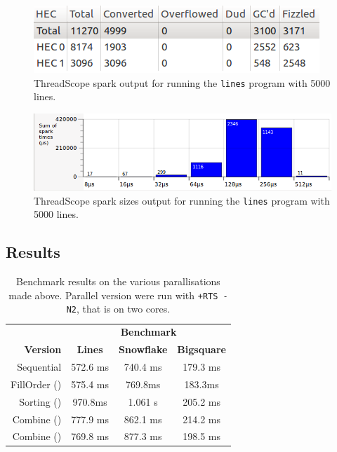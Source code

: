 \documentclass[12pt]{beamer}
\begin{document}
\begin{frame}
 \begin{figure}[H]
  \centering
  \includegraphics[scale=1]{../threadscope/fillorder/lines-spark}
  \caption{ThreadScope spark output for running the \texttt{lines} program with 5000 lines.}
  \label{fig:lines-fillorder-spark}
\end{figure}


 \begin{figure}[H]
  \centering
  \includegraphics[scale=0.7]{../threadscope/fillorder/lines-spark-sizes}
  \caption{ThreadScope spark sizes output for running the \texttt{lines} program with 5000 lines.}
  \label{fig:lines-fillorder-sizes}
\end{figure}
\end{frame}


\subsection{Results}

\begin{frame}
\begin{table}[h!]
  \centering
  \begin{tabular}[h!]{|r|c|c|c|}\hline
    & \multicolumn{3}{|c|}{\textbf{Benchmark}} \\
    \textbf{Version}&\textbf{Lines}&\textbf{Snowflake}&\textbf{Bigsquare} \\\hline
    Sequential & 572.6 ms & 740.4 ms & 179.3 ms \\
    FillOrder () &  575.4 ms & 769.8ms & 183.3ms \\
    Sorting () &970.8ms& 1.061 s & 205.2 ms \\
    Combine () & 777.9 ms & 862.1 ms & 214.2 ms \\
    Combine () & 769.8 ms & 877.3 ms & 198.5 ms \\\hline
  \end{tabular}                                       
  \caption{Benchmark results on the various parallisations made above. Parallel version were run with
   \texttt{+RTS -N2}, that is on two cores.}                         
  \label{tab:benchmark-results}
\end{table}
\end{frame}
\end{document}
